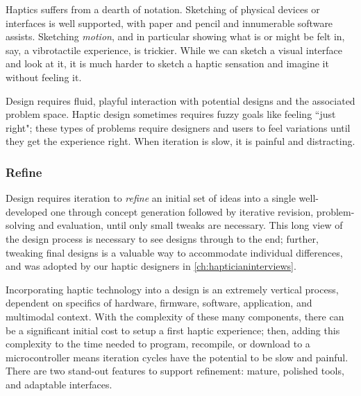 	Haptics suffers from a dearth of notation.
	Sketching of physical devices or interfaces is well supported, with paper and pencil and innumerable software assists.
	Sketching \textit{motion}, and in particular showing what is or might be felt in, say, a vibrotactile experience, is  trickier.
	While we can sketch a visual interface and look at it, it is much harder to sketch a haptic sensation and imagine it without feeling it.

Design requires fluid, playful interaction with potential designs and the associated problem space.
Haptic design sometimes requires fuzzy goals like feeling ``just right"; these types of problems require designers and users to feel variations until they get the experience right.
When iteration is slow, it is painful and distracting.


%
%
\subsubsection{Refine}
Design requires iteration to \emph{refine} an initial set of ideas into a single well-developed one through concept generation followed by iterative revision, problem-solving and  evaluation, until only small tweaks are necessary.
This long view of the design process is necessary to see designs through to the end;
further, tweaking final designs is a valuable way to accommodate individual differences, and was adopted by our haptic designers in \autoref{ch:hapticianinterviews}.

Incorporating haptic technology into a design is an extremely vertical process,  dependent on  specifics of hardware, firmware, software, application, and multimodal context.
With the complexity of these many components, there can be a significant initial cost to setup a first haptic experience; then, adding this complexity to the time needed to program, recompile, or download to a microcontroller means iteration cycles have the potential to be slow and painful. 
There are two stand-out features to support refinement: mature, polished tools, and adaptable interfaces.
%

